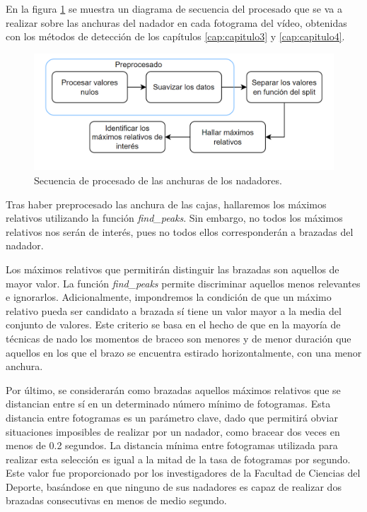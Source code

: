 En la figura \ref{fig:diagramasecuenciaanchura} se muestra un diagrama de secuencia del procesado que se va a realizar sobre las anchuras del nadador en cada fotograma del vídeo, obtenidas con los métodos de detección de los capítulos \ref{cap:capitulo3} y \ref{cap:capitulo4}.

\begin{figure}
    \centering
    \includegraphics[width=\textwidth,height=\textheight,keepaspectratio]{imagenes/parte_graficas/Anchura.png}
    \caption{Secuencia de procesado de las anchuras de los nadadores.}
    \label{fig:diagramasecuenciaanchura}
\end{figure}

Tras haber preprocesado las anchura de las cajas, hallaremos los máximos relativos utilizando la función \textit{find\_peaks}. Sin embargo, no todos los máximos relativos nos serán de interés, pues no todos ellos corresponderán a brazadas del nadador. 

Los máximos relativos que permitirán distinguir las brazadas son aquellos de mayor valor. La función \textit{find\_peaks} permite discriminar aquellos menos relevantes e ignorarlos. Adicionalmente, impondremos la condición de que un máximo relativo pueda ser candidato a brazada sí tiene un valor mayor a la media del conjunto de valores. Este criterio se basa en el hecho de que en la mayoría de técnicas de nado los momentos de braceo son menores y de menor duración que aquellos en los que el brazo se encuentra estirado horizontalmente, con una menor anchura.

Por último, se considerarán como brazadas aquellos máximos relativos que se distancian entre sí en un determinado número mínimo de fotogramas. Esta distancia entre fotogramas es un parámetro clave, dado que permitirá obviar situaciones imposibles de realizar por un nadador, como bracear dos veces en menos de 0.2 segundos. La distancia mínima entre fotogramas utilizada para realizar esta selección es igual a la mitad de la tasa de fotogramas por segundo. Este valor fue proporcionado por los investigadores de la Facultad de Ciencias del Deporte, basándose en que ninguno de sus nadadores es capaz de realizar dos brazadas consecutivas en menos de medio segundo. 

